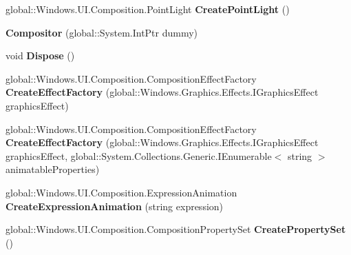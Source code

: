 \begin{DoxyCompactItemize}
\item 
\mbox{\label{class_windows_1_1_u_i_1_1_composition_1_1_compositor_abbf5f6803a17b21b39e1cf6a0b23fc6e}} 
global\+::\+Windows.\+U\+I.\+Composition.\+Point\+Light {\bfseries Create\+Point\+Light} ()
\item 
\mbox{\label{class_windows_1_1_u_i_1_1_composition_1_1_compositor_ae8673b74eda4f57113626510ac491007}} 
{\bfseries Compositor} (global\+::\+System.\+Int\+Ptr dummy)
\item 
\mbox{\label{class_windows_1_1_u_i_1_1_composition_1_1_compositor_ac90a7018efb0edbc42378c43cb94e3fa}} 
void {\bfseries Dispose} ()
\item 
\mbox{\label{class_windows_1_1_u_i_1_1_composition_1_1_compositor_a0f263c7b996908ce12d789c3d640ee71}} 
global\+::\+Windows.\+U\+I.\+Composition.\+Composition\+Effect\+Factory {\bfseries Create\+Effect\+Factory} (global\+::\+Windows.\+Graphics.\+Effects.\+I\+Graphics\+Effect graphics\+Effect)
\item 
\mbox{\label{class_windows_1_1_u_i_1_1_composition_1_1_compositor_ac3bb6a6e92997bf4740fbf43e243ea7a}} 
global\+::\+Windows.\+U\+I.\+Composition.\+Composition\+Effect\+Factory {\bfseries Create\+Effect\+Factory} (global\+::\+Windows.\+Graphics.\+Effects.\+I\+Graphics\+Effect graphics\+Effect, global\+::\+System.\+Collections.\+Generic.\+I\+Enumerable$<$ string $>$ animatable\+Properties)
\item 
\mbox{\label{class_windows_1_1_u_i_1_1_composition_1_1_compositor_ae872b8e5d7605ff92461b38237f26bcf}} 
global\+::\+Windows.\+U\+I.\+Composition.\+Expression\+Animation {\bfseries Create\+Expression\+Animation} (string expression)
\item 
\mbox{\label{class_windows_1_1_u_i_1_1_composition_1_1_compositor_a74091487764434fe783ce2e35bc897d2}} 
global\+::\+Windows.\+U\+I.\+Composition.\+Composition\+Property\+Set {\bfseries Create\+Property\+Set} ()

\end{DoxyCompactItemize}
